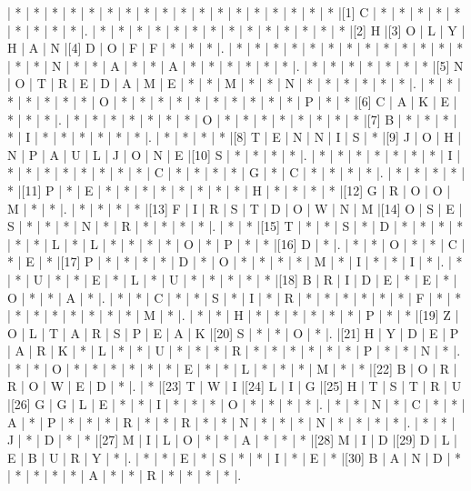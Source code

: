 \begin{Puzzle}{46}{28}
| * | * | * | * | * | * | * | * | * | * | * | * | * | * | * | * | * | * |[1]  C | * | * | * | * | * | * | * | * | * |.
| * | * | * | * | * | * | * | * | * | * | * | * | * | * |[2]  H |[3]  O | L | Y | H | A | N |[4]  D | O | F | F | * | * | * |.
| * | * | * | * | * | * | * | * | * | * | * | * | * | * | * | N | * | * | A | * | * | A | * | * | * | * | * | * |.
| * | * | * | * | * | * | * |[5]  N | O | T | R | E | D | A | M | E | * | * | M | * | * | N | * | * | * | * | * | * |.
| * | * | * | * | * | * | * | O | * | * | * | * | * | * | * | * | * | * | P | * | * |[6]  C | A | K | E | * | * | * |.
| * | * | * | * | * | * | * | O | * | * | * | * | * | * | * | * |[7]  B | * | * | * | * | I | * | * | * | * | * | * |.
| * | * | * | * |[8]  T | E | N | N | I | S | * |[9]  J | O | H | N | P | A | U | L | J | O | N | E |[10]  S | * | * | * | * |.
| * | * | * | * | * | * | * | I | * | * | * | * | * | * | * | * | C | * | * | * | * | G | * | C | * | * | * | * |.
| * | * | * | * | * |[11]  P | * | E | * | * | * | * | * | * | * | * | H | * | * | * | * |[12]  G | R | O | O | M | * | * |.
| * | * | * | * |[13]  F | I | R | S | T | D | O | W | N | M |[14]  O | S | E | S | * | * | * | N | * | R | * | * | * | * |.
| * | * |[15]  T | * | * | S | * | D | * | * | * | * | * | * | L | * | L | * | * | * | * | O | * | P | * | * |[16]  D | * |.
| * | * | O | * | * | C | * | E | * |[17]  P | * | * | * | * | D | * | O | * | * | * | * | M | * | I | * | * | I | * |.
| * | * | U | * | * | E | * | L | * | U | * | * | * | * | * |[18]  B | R | I | D | E | * | E | * | O | * | * | A | * |.
| * | * | C | * | * | S | * | I | * | R | * | * | * | * | * | * | F | * | * | * | * | * | * | * | * | * | M | * |.
| * | * | H | * | * | * | * | * | * | P | * | * |[19]  Z | O | L | T | A | R | S | P | E | A | K |[20]  S | * | * | O | * |.
|[21]  H | Y | D | E | P | A | R | K | * | L | * | * | U | * | * | * | R | * | * | * | * | * | * | P | * | * | N | * |.
| * | * | O | * | * | * | * | * | * | E | * | * | L | * | * | * | M | * | * |[22]  B | O | R | R | O | W | E | D | * |.
| * |[23]  T | W | I |[24]  L | I | G |[25]  H | T | S | T | R | U |[26]  G | G | L | E | * | * | I | * | * | * | O | * | * | * | * |.
| * | * | N | * | C | * | * | A | * | P | * | * | * | R | * | * | R | * | * | N | * | * | * | N | * | * | * | * |.
| * | * | J | * | D | * | * |[27]  M | I | L | O | * | * | A | * | * | * |[28]  M | I | D |[29]  D | L | E | B | U | R | Y | * |.
| * | * | E | * | S | * | * | I | * | E | * |[30]  B | A | N | D | * | * | * | * | * | A | * | * | R | * | * | * | * |.

\end{Puzzle}
